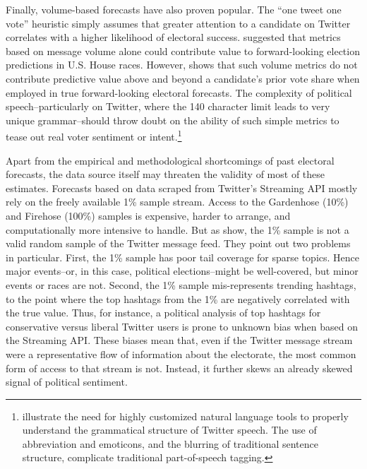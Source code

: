 \documentclass{article}
\begin{document}
Finally, volume-based forecasts have also proven popular. The ``one
tweet one vote'' heuristic simply assumes that greater attention to a
candidate on Twitter correlates with a higher likelihood of electoral
success. \cite{digrazia2013} suggested that metrics based on message
volume alone could contribute value to forward-looking election
predictions in U.S. House races. However, \cite{huberty2013twitter}
shows that such volume metrics do not contribute predictive value above
and beyond a candidate's prior vote share when employed in true
forward-looking electoral forecasts. The complexity of political
speech--particularly on Twitter, where the 140 character limit leads
to very unique grammar--should throw doubt on the ability of such
simple metrics to tease out real voter sentiment or
intent.\footnote{\cite{owoputi2013improved} illustrate the need for
  highly customized natural language tools to properly understand the
  grammatical structure of Twitter speech. The use of abbreviation and
  emoticons, and the blurring of traditional sentence structure,
  complicate traditional part-of-speech tagging.}

Apart from the empirical and methodological shortcomings of past
electoral forecasts, the data source itself may threaten the validity
of most of these estimates. Forecasts based on data scraped from
Twitter's Streaming API mostly rely on the freely available 1\% sample
stream. Access to the Gardenhose (10\%) and Firehose (100\%) samples
is expensive, harder to arrange, and computationally more intensive to
handle. But as \cite{morstatter2013sample} show, the 1\% sample is not
a valid random sample of the Twitter message feed. They point out two
problems in particular. First, the 1\% sample has poor tail coverage
for sparse topics. Hence major events--or, in this case, political
elections--might be well-covered, but minor events or races are
not. Second, the 1\% sample mis-represents trending hashtags, to the
point where the top hashtags from the 1\% are negatively correlated
with the true value. Thus, for instance, a political analysis of top
hashtags for conservative versus liberal Twitter users is prone to
unknown bias when based on the Streaming API. These biases mean that,
even if the Twitter message stream were a representative flow of
information about the electorate, the most common form of access to
that stream is not. Instead, it further skews an already skewed signal
of political sentiment.
\end{document}
